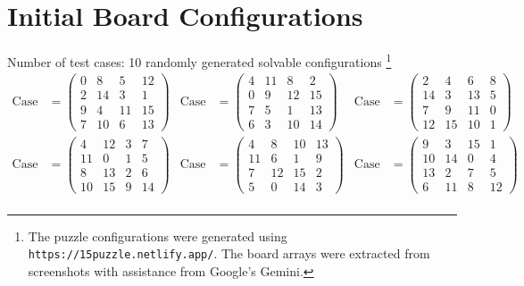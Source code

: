 \documentclass[11pt,a4paper]{article}
\begin{document}
\section{Initial Board Configurations}
\item Number of test cases: 10 randomly generated solvable configurations
\footnote{The puzzle configurations were generated using \texttt{https://15puzzle.netlify.app/}. The board arrays were extracted from screenshots with assistance from Google's Gemini.}
{\footnotesize %
\begin{align*}
\text{Case 1} &= \begin{pmatrix} 0 & 8 & 5 & 12 \\ 2 & 14 & 3 & 1 \\ 9 & 4 & 11 & 15 \\ 7 & 10 & 6 & 13 \end{pmatrix} & 
\text{Case 2} &= \begin{pmatrix} 4 & 11 & 8 & 2 \\ 0 & 9 & 12 & 15 \\ 7 & 5 & 1 & 13 \\ 6 & 3 & 10 & 14 \end{pmatrix} &
\text{Case 3} &= \begin{pmatrix} 2 & 4 & 6 & 8 \\ 14 & 3 & 13 & 5 \\ 7 & 9 & 11 & 0 \\ 12 & 15 & 10 & 1 \end{pmatrix} \\
\text{Case 4} &= \begin{pmatrix} 4 & 12 & 3 & 7 \\ 11 & 0 & 1 & 5 \\ 8 & 13 & 2 & 6 \\ 10 & 15 & 9 & 14 \end{pmatrix} &
\text{Case 5} &= \begin{pmatrix} 4 & 8 & 10 & 13 \\ 11 & 6 & 1 & 9 \\ 7 & 12 & 15 & 2 \\ 5 & 0 & 14 & 3 \end{pmatrix} &
\text{Case 6} &= \begin{pmatrix} 9 & 3 & 15 & 1 \\ 10 & 14 & 0 & 4 \\ 13 & 2 & 7 & 5 \\ 6 & 11 & 8 & 12 \end{pmatrix} \\

\end{align*}}
\end{document}
